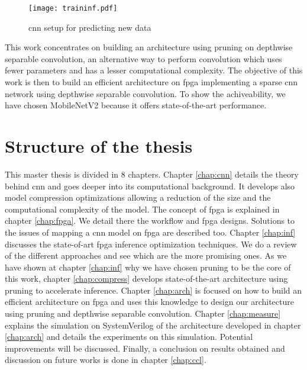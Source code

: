 %
\begin{figure}
    \texttt{[image: traininf.pdf]}
    \caption{\acrshort{cnn} setup for predicting new data}
    \label{fig:traininf}
\end{figure}\newline \newline
%
This work concentrates on building an architecture using pruning on depthwise separable convolution, an alternative way to perform convolution which uses fewer parameters and has a lesser computational complexity. The objective of this work is then to build an efficient architecture on \acrshort{fpga} implementing a sparse \acrshort{cnn} network using depthwise separable convolution. To show the achiveability, we have chosen MobileNetV2 because it offers state-of-the-art performance.
%
%
\section*{Structure of the thesis}
%
%
This master thesis is divided in 8 chapters. \newline \newline
%
Chapter \ref{chap:cnn} details the theory behind \acrshort{cnn} and goes deeper into its computational background. It develops also model compression optimizations allowing a reduction of the size and the computational complexity of the model. \newline \newline
%
The concept of \acrshort{fpga} is explained in chapter \ref{chap:fpga}. We detail there the workflow and \acrshort{fpga} designs. Solutions to the issues of mapping a \acrshort{cnn} model on \acrshort{fpga} are described too. \newline \newline
%
Chapter \ref{chap:inf} discusses the state-of-art \acrshort{fpga} inference optimization techniques. We do a review of the different approaches and see which are the more promising ones. \newline \newline
%
As we have shown at chapter \ref{chap:inf} why we have chosen pruning to be the core of this work, chapter \ref{chap:compress} develops state-of-the-art architecture using pruning to accelerate inference.
%
Chapter \ref{chap:arch} is focused on how to build an efficient architecture on \acrshort{fpga} and uses this knowledge to design our architecture using pruning and depthwise separable convolution.\newline \newline
%
Chapter \ref{chap:measure} explains the simulation on SystemVerilog of the architecture developed in chapter \ref{chap:arch} and details the experiments on this simulation. Potential improvements will be discussed.\newline \newline
%
Finally, a conclusion on results obtained and discussion on future works is done in chapter \ref{chap:ccl}.
\afterpage{\blankpage}
\cleardoublepage
\newpage
